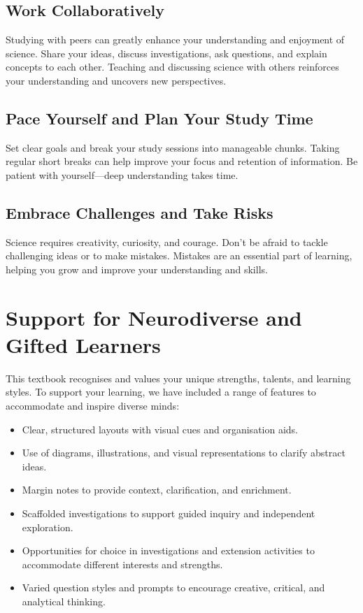 \subsection{Work Collaboratively}

Studying with peers can greatly enhance your understanding and enjoyment of science. Share your ideas, discuss investigations, ask questions, and explain concepts to each other. Teaching and discussing science with others reinforces your understanding and uncovers new perspectives.

\subsection{Pace Yourself and Plan Your Study Time}

Set clear goals and break your study sessions into manageable chunks. Taking regular short breaks can help improve your focus and retention of information. Be patient with yourself—deep understanding takes time.

\subsection{Embrace Challenges and Take Risks}

Science requires creativity, curiosity, and courage. Don’t be afraid to tackle challenging ideas or to make mistakes. Mistakes are an essential part of learning, helping you grow and improve your understanding and skills.

\section{Support for Neurodiverse and Gifted Learners}

This textbook recognises and values your unique strengths, talents, and learning styles. To support your learning, we have included a range of features to accommodate and inspire diverse minds:

\begin{itemize}
    \item Clear, structured layouts with visual cues and organisation aids.
    \item Use of diagrams, illustrations, and visual representations to clarify abstract ideas.
    \item Margin notes to provide context, clarification, and enrichment.
    \item Scaffolded investigations to support guided inquiry and independent exploration.
    \item Opportunities for choice in investigations and extension activities to accommodate different interests and strengths.
    \item Varied question styles and prompts to encourage creative, critical, and analytical thinking.
\end{itemize}

